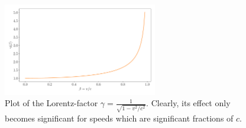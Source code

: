 \documentclass[../relativity_main.tex]{subfiles}
\begin{document}
\begin{figure}
	\centering
	
	\includegraphics[width=0.6\textwidth]{pictures/gamma_factor.pdf}
	
	\caption[Plot of the Lorentz-factor]{Plot of the Lorentz-factor $\gamma = \frac{1}{\sqrt{1 - v^2 / c^2}}$.	Clearly, its effect only becomes significant for speeds which are significant fractions of $c$.}
	\label{fig:gamma_factor}
\end{figure}
\end{document}
